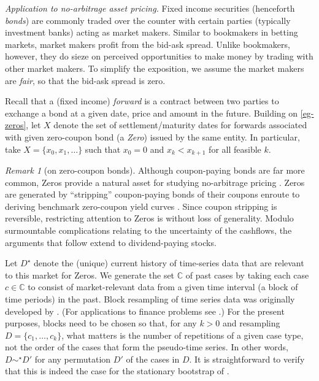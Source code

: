 \documentclass[ecta,nameyear,draft]{econsocart}
\newcommand{\mbbc}{{\mathds C}}
\newcommand{\past}{{D^\star}}
\theoremstyle{plain}
\theoremstyle{remark}
\newtheorem*{remark*}{Remark}
\begin{document}
\emph{Application to no-arbitrage asset pricing.} %
Fixed income securities (henceforth \emph{bonds}) are commonly traded over the
counter with certain parties (typically investment banks) acting as market
makers. Similar to bookmakers in betting markets, market makers profit from the
bid-ask spread. Unlike bookmakers, however, they do sieze on perceived
opportunities to make money by trading with other market makers. To simplify
the exposition, we assume the market makers are \emph{fair}, so that the
bid-ask spread is zero.

Recall that a (fixed income) \emph{forward} is a contract between two parties
to exchange a bond at a given date, price and amount in the future.  Building
on \cref{eg-zeros}, let $X$ denote the set of settlement/maturity dates for
forwards associated with given zero-coupon bond (a \emph{Zero}) issued by the
same entity. In particular, take $X = \{x_0, x_1, \dots\}$ such that $x_0 = 0$
and $x_k < x_{k + 1}$ for all feasible $k$. 
\begin{remark*}[on zero-coupon bonds] Although coupon-paying bonds are far more
  common, Zeros provide a natural asset for studying no-arbitrage pricing
  \citep{barillas2019speculation}. Zeros are generated by ``stripping''
  coupon-paying bonds of their coupons enroute to deriving benchmark
  zero-coupon yield curves \citep{brealey2020principles}. Since coupon
  stripping is reversible, restricting attention to Zeros is without loss of
  generality. Modulo surmountable complications relating to the uncertainty of
  the cashflows, the arguments that follow extend to dividend-paying stocks.
\end{remark*}

Let $\past$ denote the (unique) current history of time-series data that are
relevant to this market for Zeros.  We generate the set $\mbbc$ of past cases
by taking each case $c \in \mbbc$ to consist of market-relevant data from a
given time interval (a block of time periods) in the past. Block resampling of
time series data was originally developed by
\citet{kunsch1989jackknife,politis1994stationary}. (For applications to finance
problems see \citet{white2000reality,harvey2021lucky}.) For the present
purposes, blocks need to be chosen so that, for any $k > 0$ and resampling $D =
\{c_1, \dots, c_k\}$, what matters is the number of repetitions of a given case
type, not the order of the cases that form the pseudo-time series. In other
words, $D \sim^\star D'$ for any permutation $D'$ of the cases in $D$.  It is
straightforward to verify that this is indeed the case for the stationary
bootstrap of \citet[section 2]{politis1994stationary}.
\end{document}
